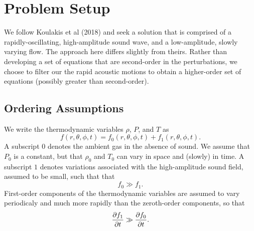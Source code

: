 \section{Problem Setup}
We follow Koulakis et al (2018) and seek a solution that is comprised of a rapidly-oscillating, high-amplitude sound wave, and a low-amplitude, slowly varying flow.   The approach here differs slightly from theirs.  Rather than developing a set of equations that are second-order in the perturbations, we choose to filter our the rapid acoustic motions to obtain a higher-order set of equations (possibly greater than second-order).

\subsection{Ordering Assumptions}

We write the thermodynamic variables $\rho$, $P$, and $T$ as
\begin{equation}
f(r,\theta,\phi,t) = f_0(r,\theta,\phi,t) + f_1(r,\theta,\phi,t).
\end{equation}
A subscript $0$ denotes the ambient gas in the absence of sound.  We assume that $P_0$ is a constant, but that $\rho_0$ and $T_0$ can vary in space and (slowly) in time.  A subscript $1$ denotes variations associated with the high-amplitude sound field, assumed to be small, such that that
\begin{equation}
f_0 \gg f_1 .
\end{equation}
First-order components of the thermodynamic variables are assumed to vary periodicaly and much more rapidly than the zeroth-order components, so that
\begin{equation}
\frac{\partial f_1}{\partial t} \gg \frac{\partial f_0}{\partial t}.
\end{equation}




